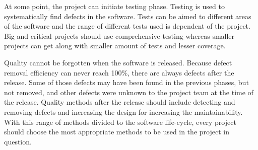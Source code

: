 At some point, the project can initiate testing phase. Testing is used to systematically find defects in the software. Tests can be aimed to different areas of the software and the range of different tests used is dependent of the project. Big and critical projects should use comprehensive testing whereas smaller projects can get along with smaller amount of tests and lesser coverage.

Quality cannot be forgotten when the software is released. Because defect removal efficiency can never reach 100\%, there are always defects after the release. Some of those defects may have been found in the previous phases, but not removed, and other defects were unknown to the project team at the time of the release. Quality methods after the release should include detecting and removing defects and increasing the design for increasing the maintainability. With this range of methods divided to the software life-cycle, every project should choose the most appropriate methods to be used in the project in question.


